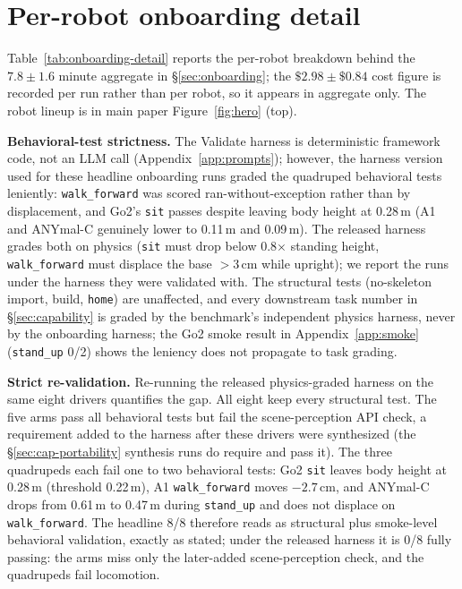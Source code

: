 \section{Per-robot onboarding detail}
\label{app:onboarding}

Table~\ref{tab:onboarding-detail} reports the per-robot
breakdown behind the $7.8 \pm 1.6$ minute aggregate in
\S\ref{sec:onboarding}; the $\$2.98 \pm \$0.84$ cost figure is
recorded per run rather than per robot, so it appears in
aggregate only.
The robot lineup is in main paper Figure~\ref{fig:hero} (top).

\noindent\textbf{Behavioral-test strictness.} The Validate
harness is deterministic framework code, not an LLM call
(Appendix~\ref{app:prompts}); however, the harness version used
for these headline onboarding runs graded the quadruped
behavioral tests leniently: \texttt{walk\_forward} was scored
ran-without-exception rather than by displacement, and Go2's
\texttt{sit} passes despite leaving body height at 0.28\,m
(A1 and ANYmal-C genuinely lower to 0.11\,m and 0.09\,m). The
released harness grades both on physics (\texttt{sit} must drop
below 0.8$\times$ standing height, \texttt{walk\_forward} must
displace the base $>$3\,cm while upright); we report the runs
under the harness they were validated with. The structural tests
(no-skeleton import, build, \texttt{home}) are unaffected, and
every downstream task number in \S\ref{sec:capability} is graded
by the benchmark's independent physics harness, never by the
onboarding harness; the Go2 smoke result in
Appendix~\ref{app:smoke} (\texttt{stand\_up} 0/2) shows the
leniency does not propagate to task grading.

\noindent\textbf{Strict re-validation.} Re-running the released
physics-graded harness on the same eight drivers quantifies the
gap. All eight keep every structural test. The five arms pass all
behavioral tests but fail the scene-perception API check, a
requirement added to the harness after these drivers were
synthesized (the \S\ref{sec:cap-portability} synthesis runs do
require and pass it). The three quadrupeds each fail one to two
behavioral tests: Go2 \texttt{sit} leaves body height at 0.28\,m
(threshold 0.22\,m), A1 \texttt{walk\_forward} moves $-2.7$\,cm,
and ANYmal-C drops from 0.61\,m to 0.47\,m during
\texttt{stand\_up} and does not displace on
\texttt{walk\_forward}. The headline 8/8 therefore reads as
structural plus smoke-level behavioral validation, exactly as
stated; under the released harness it is 0/8 fully passing: the
arms miss only the later-added scene-perception check, and the
quadrupeds fail locomotion.

